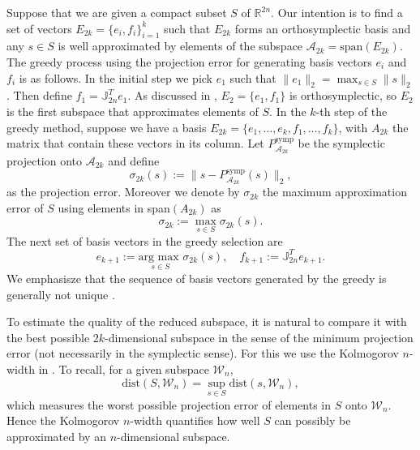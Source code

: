 Suppose that we are given a compact subset $S$ of $\mathbb R^{2n}$. Our intention is to find a set of vectors $E_{2k}=\{e_i,f_i\}_{i=1}^k$ such that $E_{2k}$ forms an orthosymplectic basis and any $s\in S$ is well approximated by elements of the subspace $\mathcal A_{2k}= \text{span}(E_{2k})$. The greedy process using the projection error for generating basis vectors $e_i$ and $f_i$ is as follows. In the initial step we pick $e_1$ such that $\|e_1\|_2 = \max_{s\in S} \|s\|_2$. Then define $f_1 = \mathbb{J}_{2n}^T e_1$. As discussed in ,  $E_2 = \{e_1,f_1\}$ is orthosymplectic, so $E_2$ is the first subspace that approximates elements of $S$. In the $k$-th step of the greedy method, suppose we have a basis $E_{2k} = \{ e_1,\dots, e_k , f_1,\dots ,f_k \}$, with $A_{2k}$ the matrix that contain these vectors in its column. Let $P_{\mathcal A_{2k}}^{\text{symp}}$ be the symplectic projection onto $\mathcal A_{2k}$ and define
\begin{equation} \label{eq:new1}
	\sigma_{2k}(s) := \|s-P_{\mathcal A_{2k}}^{\text{symp}}(s)\|_2,
\end{equation}
as the projection error. Moreover we denote by $\sigma_{2k}$ the maximum approximation error of $S$ using elements in span$(A_{2k})$ as
\begin{equation} \label{eq:new2}
	\sigma_{2k} := \max_{s\in S} \sigma_{2k}(s).
\end{equation}
The next set of basis vectors in the greedy selection are
\begin{equation} \label{eq:new3}
	e_{k+1} := \underset{s\in S}{\text{arg\ max }}\sigma_{2k}(s), \quad f_{k+1} := \mathbb{J}_{2n}^T e_{k+1}.
\end{equation}
We emphasisze that the sequence of basis vectors generated by the greedy is generally not unique \cite{quarteroni2015reduced,hesthaven2015certified}. 

To estimate the quality of the reduced subspace, it is natural to compare it with the best possible $2k$-dimensional subspace in the sense of the minimum projection error (not necessarily in the symplectic sense). For this we use the Kolmogorov $n$-width \cite{Kolmogoroff:1936fj,pinkus1985n} in . To recall, for a given subspace $\mathcal W_n$,
\begin{equation}
	\text{dist}(S,\mathcal W_n) = \sup_{s\in S} \text{dist}(s,\mathcal W_n),
\end{equation}
which measures the worst possible projection error of elements in $S$ onto $\mathcal W_n$. Hence the Kolmogorov $n$-width quantifies how well $S$ can possibly be approximated by an $n$-dimensional subspace. 


